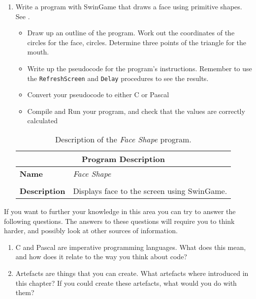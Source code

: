 \begin{enumerate}
  \item Write a program with SwinGame that draws a face using primitive shapes. See .
  \begin{itemize}
    \item Draw up an outline of the program. Work out the coordinates of the circles for the face, circles. Determine three points of the triangle for the mouth.
    \item Write up the pseudocode for the program's instructions. Remember to use the \texttt{RefreshScreen} and \texttt{Delay} procedures to see the results.
    \item Convert your pseudocode to either C or Pascal
    \item Compile and Run your program, and check that the values are correctly calculated
  \end{itemize}
  
  \begin{table}[h]
  \centering
  \begin{tabular}{l|p{12cm}}
    \hline
    \multicolumn{2}{c}{\textbf{Program Description}} \\
    \hline
    \textbf{Name} & \emph{Face Shape} \\
    \\
    \textbf{Description} & Displays face to the screen using SwinGame. \\
    \hline
  \end{tabular}
  \caption{Description of the \emph{Face Shape} program.}
  \label{tbl:face-shape}
  \end{table}
  
\end{enumerate}

\bigskip
If you want to further your knowledge in this area you can try to answer the following questions. The answers to these questions will require you to think harder, and possibly look at other sources of information.
\begin{enumerate}
  \item C and Pascal are imperative programming languages. What does this mean, and how does it relate to the way you think about code?
  \item Artefacts are things that you can create. What artefacts where introduced in this chapter? If you could create these artefacts, what would you do with them?
\end{enumerate}
